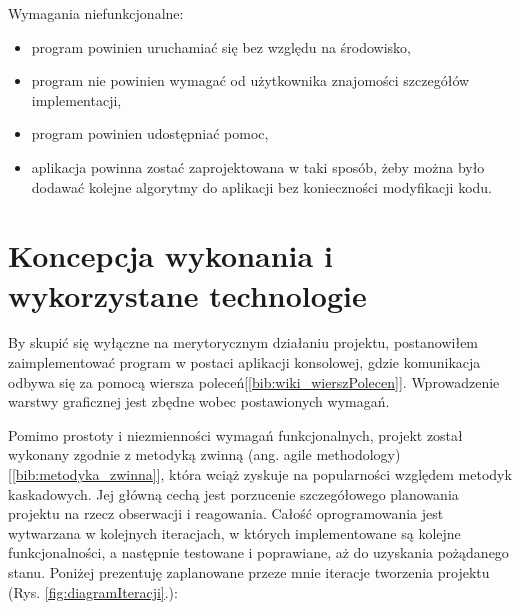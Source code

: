 Wymagania niefunkcjonalne:
\begin{itemize}
	\item program powinien uruchamiać się bez względu na środowisko,
	\item program nie powinien wymagać od użytkownika znajomości szczegółów implementacji,
	\item program powinien udostępniać pomoc,
	\item aplikacja powinna zostać zaprojektowana w taki sposób, żeby można było dodawać kolejne algorytmy do aplikacji bez konieczności modyfikacji kodu.
\end{itemize}

\section{Koncepcja wykonania i wykorzystane technologie}
By skupić się wyłączne na merytorycznym działaniu projektu, postanowiłem zaimplementować program w postaci aplikacji konsolowej, gdzie komunikacja odbywa się za pomocą wiersza poleceń[\ref{bib:wiki_wierszPolecen}]. Wprowadzenie warstwy graficznej jest zbędne wobec postawionych wymagań.

Pomimo prostoty i niezmienności wymagań funkcjonalnych, projekt został wykonany zgodnie z metodyką zwinną (ang. agile methodology)[\ref{bib:metodyka_zwinna}], która wciąż zyskuje na popularności względem metodyk kaskadowych. Jej główną cechą jest porzucenie szczegółowego planowania projektu na rzecz obserwacji i reagowania. Całość oprogramowania jest wytwarzana w kolejnych iteracjach, w których implementowane są kolejne funkcjonalności, a następnie testowane i poprawiane, aż do uzyskania pożądanego stanu. Poniżej prezentuję zaplanowane przeze mnie iteracje tworzenia projektu (Rys. \ref{fig:diagramIteracji}.):

